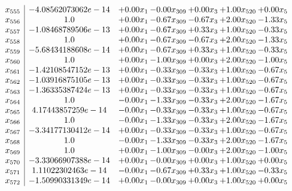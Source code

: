 \documentclass[8pt]{article}
\begin{document}
\[\begin{array}{c| c c@{\hskip 2pt} c@{\hskip 2pt} c@{\hskip 2pt} c@{\hskip 2pt} c@{\hskip 2pt} }
 x_{555}   &  -4.08562073062e-14 & +  0.00 x_{1} & -0.00 x_{309} & +  0.00 x_{3} & +  1.00 x_{520} & +  0.00 x_{5}\\
 x_{556}   &  1.0 & +  0.00 x_{1} & -0.67 x_{309} & -0.67 x_{3} & +  2.00 x_{520} & -1.33 x_{5}\\
 x_{557}   &  -1.08468789506e-13 & +  0.00 x_{1} & -0.67 x_{309} & +  0.33 x_{3} & +  1.00 x_{520} & -0.33 x_{5}\\
 x_{558}   &  1.0 & +  0.00 x_{1} & -0.67 x_{309} & -0.67 x_{3} & +  2.00 x_{520} & -1.33 x_{5}\\
 x_{559}   &  -5.68434188608e-14 & +  0.00 x_{1} & -0.67 x_{309} & +  0.33 x_{3} & +  1.00 x_{520} & -0.33 x_{5}\\
 x_{560}   &  1.0 & +  0.00 x_{1} & -1.00 x_{309} & +  0.00 x_{3} & +  2.00 x_{520} & -1.00 x_{5}\\
 x_{561}   &  -1.42108547152e-13 & +  0.00 x_{1} & -0.33 x_{309} & -0.33 x_{3} & +  1.00 x_{520} & -0.67 x_{5}\\
 x_{562}   &  -1.03916875105e-13 & +  0.00 x_{1} & -0.33 x_{309} & -0.33 x_{3} & +  1.00 x_{520} & -0.67 x_{5}\\
 x_{563}   &  -1.36335387424e-13 & +  0.00 x_{1} & -0.33 x_{309} & -0.33 x_{3} & +  1.00 x_{520} & -0.67 x_{5}\\
 x_{564}   &  1.0 & -0.00 x_{1} & -1.33 x_{309} & -0.33 x_{3} & +  2.00 x_{520} & -1.67 x_{5}\\
 x_{565}   &  4.17443857259e-14 & -0.00 x_{1} & -0.33 x_{309} & -0.33 x_{3} & +  1.00 x_{520} & -0.67 x_{5}\\
 x_{566}   &  1.0 & -0.00 x_{1} & -1.33 x_{309} & -0.33 x_{3} & +  2.00 x_{520} & -1.67 x_{5}\\
 x_{567}   &  -3.34177130412e-14 & +  0.00 x_{1} & -0.33 x_{309} & -0.33 x_{3} & +  1.00 x_{520} & -0.67 x_{5}\\
 x_{568}   &  1.0 & -0.00 x_{1} & -1.33 x_{309} & -0.33 x_{3} & +  2.00 x_{520} & -1.67 x_{5}\\
 x_{569}   &  1.0 & +  0.00 x_{1} & -1.00 x_{309} & -0.00 x_{3} & +  2.00 x_{520} & -1.00 x_{5}\\
 x_{570}   &  -3.33066907388e-14 & +  0.00 x_{1} & -0.00 x_{309} & +  0.00 x_{3} & +  1.00 x_{520} & +  0.00 x_{5}\\
 x_{571}   &  1.11022302463e-14 & -0.00 x_{1} & -0.67 x_{309} & +  0.33 x_{3} & +  1.00 x_{520} & -0.33 x_{5}\\
 x_{572}   &  -1.50990331349e-14 & +  0.00 x_{1} & -0.00 x_{309} & +  0.00 x_{3} & +  1.00 x_{520} & +  0.00 x_{5}\\

\end{array}\]
\end{document}
